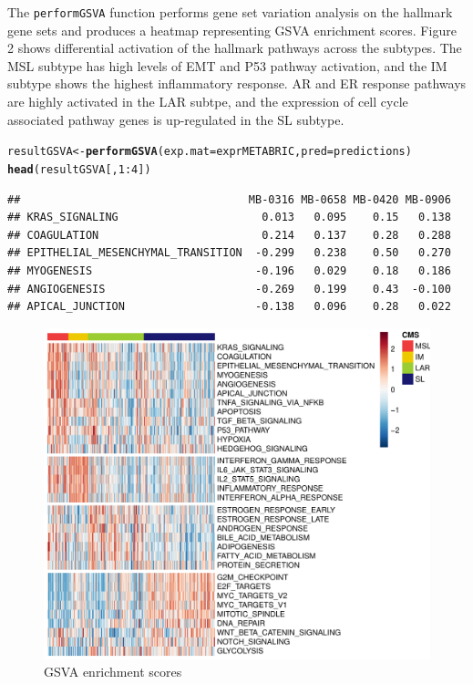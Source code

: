 \documentclass{article}\usepackage[]{graphicx}\usepackage[]{color}
\makeatletter
\def\maxwidth{ %
  \ifdim\Gin@nat@width>\linewidth
    \linewidth
  \else
    \Gin@nat@width
  \fi
}
\newcommand{\hlnum}[1]{\textcolor[rgb]{0.686,0.059,0.569}{#1}}%
\newcommand{\hlopt}[1]{\textcolor[rgb]{0,0,0}{#1}}%
\newcommand{\hlstd}[1]{\textcolor[rgb]{0.345,0.345,0.345}{#1}}%
\newcommand{\hlkwb}[1]{\textcolor[rgb]{0.69,0.353,0.396}{#1}}%
\newcommand{\hlkwc}[1]{\textcolor[rgb]{0.333,0.667,0.333}{#1}}%
\newcommand{\hlkwd}[1]{\textcolor[rgb]{0.737,0.353,0.396}{\textbf{#1}}}%
\newenvironment{kframe}{%
 \def\at@end@of@kframe{}%
 \ifinner\ifhmode%
  \def\at@end@of@kframe{\end{minipage}}%
  \begin{minipage}{\columnwidth}%
 \fi\fi%
 \def\FrameCommand##1{\hskip\@totalleftmargin \hskip-\fboxsep
 \colorbox{shadecolor}{##1}\hskip-\fboxsep
     \hskip-\linewidth \hskip-\@totalleftmargin \hskip\columnwidth}%
 \MakeFramed {\advance\hsize-\width
   \@totalleftmargin\z@ \linewidth\hsize
   \@setminipage}}%
 {\par\unskip\endMakeFramed%
 \at@end@of@kframe}
\newenvironment{knitrout}{}{} %
\makeatother
\begin{document}
The \texttt{performGSVA} function performs gene set variation analysis on the hallmark gene sets and produces a heatmap representing GSVA enrichment scores. Figure 2 shows differential activation of the hallmark pathways across the subtypes. The MSL subtype has high levels of EMT and P53 pathway activation, and the IM subtype shows the highest inflammatory response. AR and ER response pathways are highly activated in the LAR subtpe, and the expression of cell cycle associated pathway genes is up-regulated in the SL subtype.
\begin{knitrout}
\color{fgcolor}\begin{kframe}
\begin{alltt}
\hlstd{resultGSVA} \hlkwb{<-} \hlkwd{performGSVA}\hlstd{(}\hlkwc{exp.mat} \hlstd{= exprMETABRIC,} \hlkwc{pred} \hlstd{= predictions)}
\hlkwd{head}\hlstd{(resultGSVA[,}\hlnum{1}\hlopt{:}\hlnum{4}\hlstd{])}
\end{alltt}
\begin{verbatim}
##                                   MB-0316 MB-0658 MB-0420 MB-0906
## KRAS_SIGNALING                      0.013   0.095    0.15   0.138
## COAGULATION                         0.214   0.137    0.28   0.288
## EPITHELIAL_MESENCHYMAL_TRANSITION  -0.299   0.238    0.50   0.270
## MYOGENESIS                         -0.196   0.029    0.18   0.186
## ANGIOGENESIS                       -0.269   0.199    0.43  -0.100
## APICAL_JUNCTION                    -0.138   0.096    0.28   0.022
\end{verbatim}
\end{kframe}\begin{figure}[H]
\includegraphics[width=\maxwidth]{figure/gsa-1} \caption[GSVA enrichment scores]{GSVA enrichment scores}\label{fig:gsa}
\end{figure}


\end{knitrout}
\end{document}
